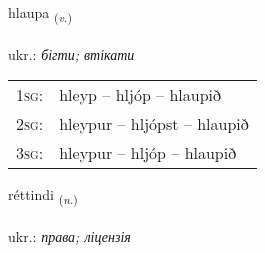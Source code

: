 \documentclass[frontgrid, backgrid]{flacards}\usepackage[]{graphicx}\usepackage[]{xcolor}
\begin{document}
\renewcommand{\flhead}{\vskip5pt \fboxsep=0pt {\small\bfseries\footnotesize Sagnorð | дієслово}}
\renewcommand{\fcfoot}{\vskip5pt \fboxsep=0pt \hspace{2pt}{\small\bfseries\footnotesize 1K}}

\renewcommand{\blhead}{\vskip5pt {\small\bfseries\footnotesize Sagnorð | дієслово }}
\renewcommand{\bcfoot}{\vskip5pt \hspace{2pt}{\small\bfseries\footnotesize 1K}}


{hlaupa \small{\textsubscript{(\textit{v.})}} \\[1ex] %
\textphonetic{[l̥œiːpa]} \\
ukr.: \emph{бігти; втікати} \\  [2ex]
\renewcommand*{\arraystretch}{0.8}
\begin{tabular}{p{1cm}l}
\textsc{1sg}: & hleyp -- hljóp -- hlaupið \\ 
\textsc{2sg}: & hleypur -- hljópst -- hlaupið \\ 
\textsc{3sg}: & hleypur -- hljóp -- hlaupið \\ 
\end{tabular}
}

\renewcommand{\flhead}{\vskip5pt \fboxsep=0pt {\small\bfseries\footnotesize Nafnorð | іменник}}
\renewcommand{\fcfoot}{\vskip5pt \fboxsep=0pt \hspace{2pt}{\small\bfseries\footnotesize 1K}}

\renewcommand{\blhead}{\vskip5pt {\small\bfseries\footnotesize Nafnorð | іменник }}
\renewcommand{\bcfoot}{\vskip5pt \hspace{2pt}{\small\bfseries\footnotesize 1K}}


{réttindi \small{\textsubscript{(\textit{n.})}} \\[1ex] %
\textphonetic{[rjɛhtɪntɪ]} \\
ukr.: \emph{права; ліцензія} \\  [2ex]
\renewcommand*{\arraystretch}{0.8}
}
\end{document}
